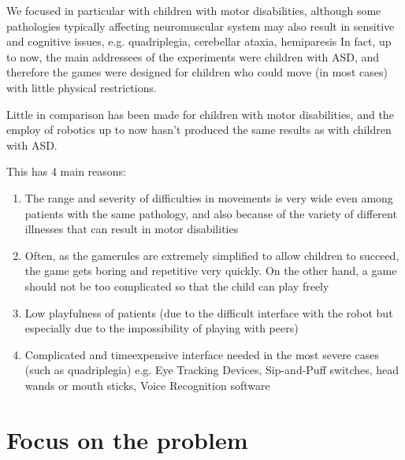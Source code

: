 \documentclass[a4paper,twoside]{book}
\begin{document}
We focused in particular with children with motor disabilities, although some pathologies typically affecting neuromuscular system may also result in sensitive and cognitive issues, e.g. quadriplegia, cerebellar ataxia, hemiparesis \textellipsis
In fact, up to now, the main addressees of the experiments were children with ASD, and therefore the games were designed for children who could move (in most cases) with little physical restrictions.

Little in comparison has been made for children with motor disabilities, and the employ of robotics up to now hasn't produced the same results as with children with ASD.

\beforelist This has 4 main reasons:
\begin{enumerate}
\item The range and severity of difficulties in movements is very wide even among patients with the same pathology, and also because of the variety of different illnesses that can result in motor disabilities
\item Often, as the game\textendash rules are extremely simplified to allow children to succeed, the game gets boring and repetitive very quickly. On the other hand, a game should not be too complicated so that the child can play freely
\item Low playfulness of patients (due to the difficult interface with the robot but especially due to the impossibility of playing with peers)
\item Complicated and time\textendash expensive interface needed in the most severe cases (such as quadriplegia) e.g. Eye Tracking Devices, Sip-and-Puff switches, head wands or mouth sticks, Voice Recognition software \textellipsis
\end{enumerate}
\afterlist*

\section{Focus on the problem}
\end{document}
